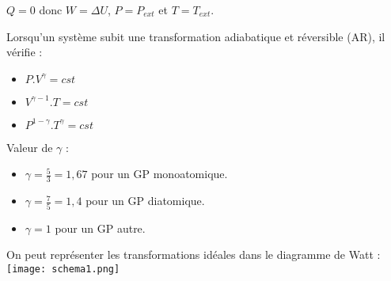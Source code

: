 \documentclass[11pt]{article}
\theoremstyle{cstyle}{\newtheorem{definition}{Définition}[section]}
\theoremstyle{cstyle}{\newtheorem{proposition}[definition]{Propriété}}
\theoremstyle{cstyle}{\newtheorem{theorem}[definition]{Théorème}}
\theoremstyle{mystyle}{\newtheorem{lemma}[definition]{Lemme}}
\theoremstyle{mystyle}{\newtheorem{corollary}[definition]{Corollaire}}
\theoremstyle{mystyle}{\newtheorem*{remark}{Remarque}}
\theoremstyle{mystyle}{\newtheorem*{remarks}{Remarques}}
\theoremstyle{mystyle}{\newtheorem*{example}{Exemple}}
\theoremstyle{mystyle}{\newtheorem*{examples}{Exemples}}
\theoremstyle{definition}{\newtheorem*{exercise}{Exercice}}
\theoremstyle{mystyle}{\newtheorem*{methode}{Méthode}}
\theoremstyle{cstyle}{\newtheorem*{cthm}{}}
\theoremstyle{warn}
\begin{document}
	\begin{minipage}[t]{0.45\textwidth}
		\begin{definition}
			\(Q = 0\) donc \(W = \Delta U\), \(P = P_{ext}\) et \(T = T_{ext}\).
		\end{definition}
		
		\begin{proposition}
			Lorsqu'un système subit une transformation adiabatique et réversible (AR), il vérifie :
			\begin{itemize}
				\item \(P.V^{\gamma} = cst\)
				\item \(V^{\gamma - 1}.T = cst\)
				\item \(P^{1 - \gamma}.T^{\gamma} = cst\)
			\end{itemize}
			
			Valeur de \(\gamma\) :
			\begin{itemize}
				\item \(\gamma = \frac{5}{3} = 1,67\) pour un GP monoatomique.
				\item \(\gamma = \frac{7}{5} = 1,4\) pour un GP diatomique.
				\item \(\gamma = 1\) pour un GP autre.
			\end{itemize}
		\end{proposition}
	
		\begin{proposition}
			On peut représenter les transformations idéales dans le diagramme de Watt :
			\texttt{[image: schema1.png]}
		\end{proposition}
	\end{minipage}
	
	
\end{document}
